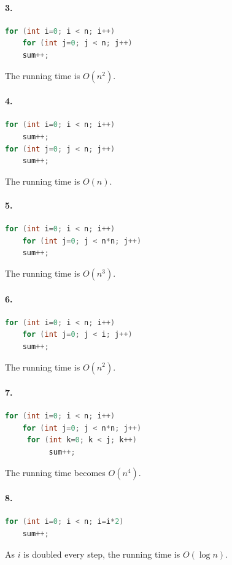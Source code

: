 \documentclass[a4paper, 11pt, notitlepage, english]{article}
\begin{document}
\paragraph{3.}
\begin{lstlisting}[language=java]
for (int i=0; i < n; i++)
    for (int j=0; j < n; j++)
	sum++;
\end{lstlisting}
The running time is $O(n^2)$.

\paragraph{4.}
\begin{lstlisting}[language=java]
for (int i=0; i < n; i++)
	sum++;
for (int j=0; j < n; j++)
	sum++;
\end{lstlisting}
The running time is $O(n)$.

\paragraph{5.}
\begin{lstlisting}[language=java]
for (int i=0; i < n; i++)
    for (int j=0; j < n*n; j++)
	sum++;
\end{lstlisting}
The running time is $O(n^3)$.

\paragraph{6.}
\begin{lstlisting}[language=java]
for (int i=0; i < n; i++)
    for (int j=0; j < i; j++)
	sum++;
\end{lstlisting}
The running time is $O(n^2)$.

\paragraph{7.}
\begin{lstlisting}[language=java]
for (int i=0; i < n; i++)
    for (int j=0; j < n*n; j++)
	 for (int k=0; k < j; k++)
	      sum++;
\end{lstlisting}
The running time becomes $O(n^4)$.

\paragraph{8.}
\begin{lstlisting}[language=java]
for (int i=0; i < n; i=i*2)
    sum++;
\end{lstlisting}
As $i$ is doubled every step, the running time is $O(\log n)$.
\end{document}
